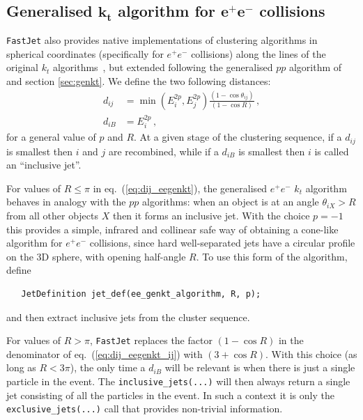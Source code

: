 \documentclass[12pt,a4]{article}
\newcommand{\fastjet}{\texttt{FastJet}\xspace}
\newcommand{\ttt}[1]{{\small\texttt{#1}}}
\begin{document}
\subsection[Generalised $k_t$ algorithm for $e^+e^-$ collisions]
{Generalised $\boldsymbol{k_t}$ algorithm for $\boldsymbol{e^+e^-}$ collisions}
\label{sec:ee-algs}

\fastjet also provides native implementations of clustering algorithms
in spherical coordinates (specifically for $e^+e^-$ collisions) along
the lines of the original $k_t$ algorithms~\cite{eekt}, but extended
following  the generalised $pp$ algorithm of~\cite{antikt} and
section \ref{sec:genkt}. We define the two following distances:
\begin{subequations}
  \label{eq:dij_eegenkt}
\begin{align}
  \label{eq:dij_eegenkt_ij}
  d_{ij} &= \min(E_i^{2p}, E_j^{2p}) \frac{(1- \cos
    \theta_{ij})}{(1-\cos R)}\,,\\
  d_{iB} &= E_i^{2p}\,,
\end{align}
\end{subequations}
for a general value of $p$ and $R$. At a given stage of the clustering
sequence, if a $d_{ij}$ is smallest then $i$ and $j$ are recombined,
while if a $d_{iB}$ is smallest then $i$ is called an ``inclusive
jet''. 

For values of $R \le \pi$ in eq.~(\ref{eq:dij_eegenkt}), the
generalised $e^+e^-$ $k_t$ algorithm behaves in analogy with the $pp$
algorithms: when an object is at an angle $\theta_{iX} > R$ from all
other objects $X$ then it forms an inclusive jet.
%
With the choice $p=-1$ this provides a simple, infrared and collinear
safe way of obtaining a cone-like algorithm for $e^+e^-$ collisions,
since hard well-separated jets have a circular profile on the $3$D
sphere, with opening half-angle $R$.
%
To use this form of the algorithm, define 
\begin{lstlisting}
   JetDefinition jet_def(ee_genkt_algorithm, R, p);
\end{lstlisting}
and then extract inclusive jets from the cluster sequence.

For values of $R > \pi$, \fastjet replaces the factor $(1-\cos R)$ in
the denominator of eq.~(\ref{eq:dij_eegenkt_ij}) with $(3+\cos
R)$. With this choice (as long as $R < 3\pi$), the only time a $d_{iB}$ will
be relevant is when there is just a single particle in the event.
%
The \ttt{inclusive\_jets(...)} will then always return a single jet
consisting of all the particles in the event. 
%
In such a context it is only the \ttt{exclusive\_jets(...)} call that
provides non-trivial information.
\end{document}
